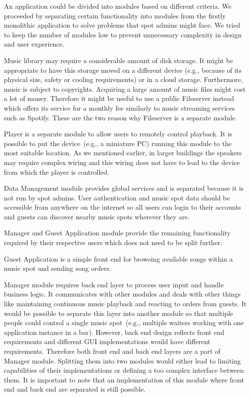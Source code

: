 An application could be divided into modules based on different criteria. We proceeded by separating certain functionality into modules from the firstly monolithic application to solve problems that spot admins might face. We tried to keep the number of modules low to prevent unnecessary complexity in design and user experience.
\par
Music library may require a considerable amount of disk storage. It might be appropriate to have this storage moved on a different device (e.g., because of its physical size, safety or cooling requirements) or in a cloud storage. Furthermore, music is subject to copyrights. Acquiring a large amount of music files might cost a lot of money. Therefore it might be useful to use a public Fileserver instead which offers its service for a monthly fee similarly to music streaming services such as Spotify. These are the two reason why Fileserver is a separate module.
\par
Player is a separate module to allow users to remotely control playback. It is possible to put the device~(e.g., a miniature PC) running this module to the most suitable location. As we mentioned earlier, in larger buildings the speakers may require complex wiring and this wiring does not have to lead to the device from which the player is controlled.
\par
Data Management module provides global services and is separated because it is not run by spot admins. User authentication and music spot data should be accessible from anywhere on the internet so all users can login to their accounts and guests can discover nearby music spots wherever they are.
\par
Manager and Guest Application module provide the remaining functionality required by their respective users which does not need to be split further.
\par
Guest Application is a simple front end for browsing available songs within a music spot and sending song orders.
\par
Manager module requires back end layer to process user input and handle business logic. It communicates with other modules and deals with other things like maintaining continuous music playback and reacting to orders from guests. It would be possible to separate this layer into another module so that multiple people could control a single music spot~(e.g., multiple waiters working with one application instance in a bar). However, back end design reflects front end requirements and different GUI implementations would have different requirements. Therefore both front end and back end layers are a part of Manager module. Splitting them into two modules would either lead to limiting capabilities of their implementations or defining a too complex interface between them. It is important to note that an implementation of this module where front end and back end are separated is still possible.

